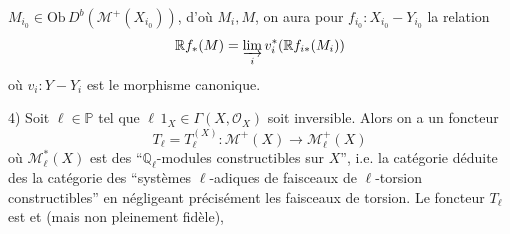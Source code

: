 $M_{i_0}\in\mathrm{Ob}\,D^b(\mathcal M^+(X_{i_0}))$, d'où $M_i,M$, on %
aura pour $f_{i_0}:X_{i_0}-Y_{i_0}$ la relation %
\[
\mathbb R f_*(M)=\varinjlim_i v_i^*(\mathbb R f_{i*}(M_i)) %
\]
où $v_i:Y-Y_i$ est le morphisme %
canonique. %

4) Soit $\ell\in\mathbb P$ tel que $\ell\,1_X\in\Gamma(X,\mathscr O_X)$ soit %
inversible. Alors on a un foncteur %
\[
T_\ell=T_\ell^{(X)}:\mathcal M^+(X)\longrightarrow\mathcal M_\ell^+(X) %
\]
où $\mathcal M_\ell^{*}(X)$ est   des ``$\mathbb Q_\ell$-modules %
constructibles sur $X$'', i.e. la catégorie %
déduite des la catégorie des ``systèmes %
$\ell$-adiques de faisceaux de $\ell$-torsion %
constructibles'' en négligeant précisément %
les faisceaux de torsion. Le foncteur %
$T_\ell$ est   et  (mais non %
pleinement fidèle),  %

